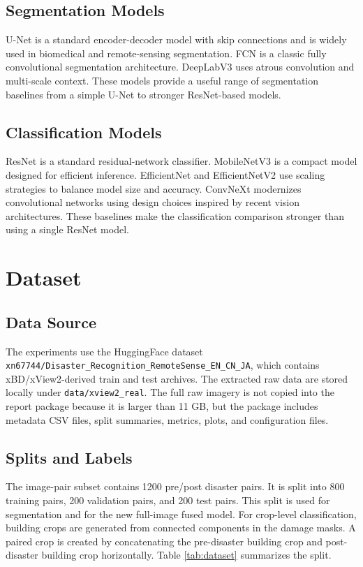 \documentclass[10pt,conference]{IEEEtran}
\begin{document}
\subsection{Segmentation Models}
U-Net \cite{ronneberger2015unet} is a standard encoder-decoder model with skip connections and is widely used in biomedical and remote-sensing segmentation. FCN \cite{long2015fcn} is a classic fully convolutional segmentation architecture. DeepLabV3 \cite{chen2018deeplab} uses atrous convolution and multi-scale context. These models provide a useful range of segmentation baselines from a simple U-Net to stronger ResNet-based models.

\subsection{Classification Models}
ResNet \cite{he2016resnet} is a standard residual-network classifier. MobileNetV3 \cite{howard2019mobilenetv3} is a compact model designed for efficient inference. EfficientNet and EfficientNetV2 \cite{tan2019efficientnet,tan2021efficientnetv2} use scaling strategies to balance model size and accuracy. ConvNeXt \cite{liu2022convnet} modernizes convolutional networks using design choices inspired by recent vision architectures. These baselines make the classification comparison stronger than using a single ResNet model.

\section{Dataset}
\subsection{Data Source}
The experiments use the HuggingFace dataset \texttt{xn67744/Disaster\_Recognition\_RemoteSense\_EN\_CN\_JA}, which contains xBD/xView2-derived train and test archives. The extracted raw data are stored locally under \texttt{data/xview2\_real}. The full raw imagery is not copied into the report package because it is larger than 11 GB, but the package includes metadata CSV files, split summaries, metrics, plots, and configuration files.

\subsection{Splits and Labels}
The image-pair subset contains 1200 pre/post disaster pairs. It is split into 800 training pairs, 200 validation pairs, and 200 test pairs. This split is used for segmentation and for the new full-image fused model. For crop-level classification, building crops are generated from connected components in the damage masks. A paired crop is created by concatenating the pre-disaster building crop and post-disaster building crop horizontally. Table \ref{tab:dataset} summarizes the split.
\end{document}
